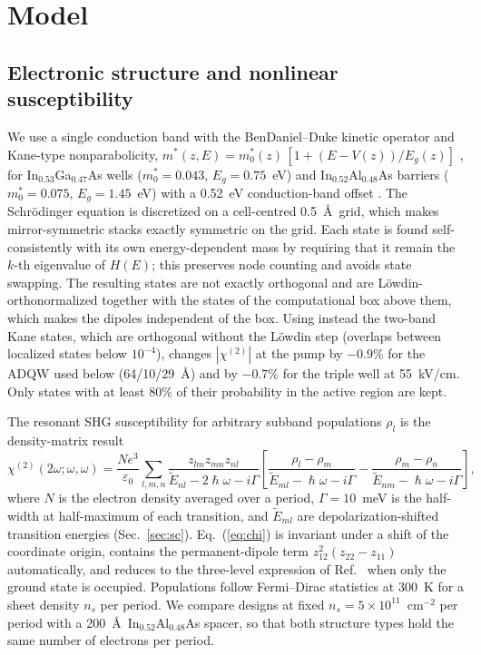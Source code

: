 \documentclass[11pt]{article}
\newcommand{\chitwo}{\chi^{(2)}}
\begin{document}
\section{Model}
\subsection{Electronic structure and nonlinear susceptibility}
We use a single conduction band with the BenDaniel--Duke kinetic operator \cite{BenDaniel1966} and Kane-type nonparabolicity, $m^*(z,E)=m^*_0(z)\,[1+(E-V(z))/E_g(z)]$ \cite{Nelson1987}, for In$_{0.53}$Ga$_{0.47}$As wells ($m^*_0=0.043$, $E_g=0.75$~eV) and In$_{0.52}$Al$_{0.48}$As barriers ($m^*_0=0.075$, $E_g=1.45$~eV) with a 0.52~eV conduction-band offset \cite{Vurgaftman2001}. The Schr\"odinger equation is discretized on a cell-centred 0.5~\AA\ grid, which makes mirror-symmetric stacks exactly symmetric on the grid. Each state is found self-consistently with its own energy-dependent mass by requiring that it remain the $k$-th eigenvalue of $H(E)$; this preserves node counting and avoids state swapping. The resulting states are not exactly orthogonal and are L\"owdin-orthonormalized \cite{Lowdin1950} together with the states of the computational box above them, which makes the dipoles independent of the box. Using instead the two-band Kane states, which are orthogonal without the L\"owdin step (overlaps between localized states below $10^{-4}$), changes $|\chitwo|$ at the pump by $-0.9\%$ for the ADQW used below (64/10/29~\AA) and by $-0.7\%$ for the triple well at 55~kV/cm. Only states with at least 80\% of their probability in the active region are kept.

The resonant SHG susceptibility for arbitrary subband populations $\rho_l$ is the density-matrix result \cite{Boyd2008,Rosencher1991}
\begin{equation}
\chitwo(2\omega;\omega,\omega)=\frac{Ne^3}{\varepsilon_0}\sum_{l,m,n}\frac{z_{lm}z_{mn}z_{nl}}{\tilde E_{nl}-2\hslash\omega-i\Gamma}\left[\frac{\rho_l-\rho_m}{\tilde E_{ml}-\hslash\omega-i\Gamma}-\frac{\rho_m-\rho_n}{\tilde E_{nm}-\hslash\omega-i\Gamma}\right],\label{eq:chi}
\end{equation}
where $N$ is the electron density averaged over a period, $\Gamma=10$~meV is the half-width at half-maximum of each transition, and $\tilde E_{ml}$ are depolarization-shifted transition energies (Sec.~\ref{sec:sc}). Eq.~(\ref{eq:chi}) is invariant under a shift of the coordinate origin, contains the permanent-dipole term $z_{12}^2(z_{22}-z_{11})$ automatically, and reduces to the three-level expression of Ref.~\cite{Vurgaftman2021} when only the ground state is occupied. Populations follow Fermi--Dirac statistics at 300~K for a sheet density $n_s$ per period. We compare designs at fixed $n_s=5\times10^{11}$~cm$^{-2}$ per period with a 200~\AA\ In$_{0.52}$Al$_{0.48}$As spacer, so that both structure types hold the same number of electrons per period.
\end{document}

